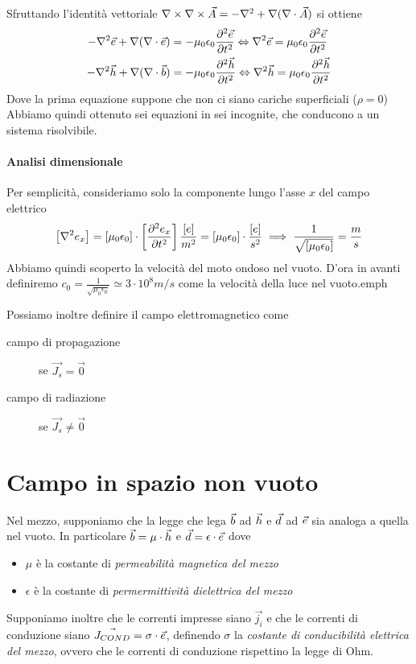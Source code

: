 Sfruttando l'identità vettoriale $\rot\rot\vec{A} = -\nabla^2 + \nabla(\diverg\vec{A})$ si ottiene
\begin{equation}\begin{split}
  -\nabla^2\e + \nabla(\diverg\e) &= - \mu_0\epsilon_0 \deriv[2]{\e}{t} \Leftrightarrow \nabla^2\e = \mu_0\epsilon_0\deriv[2]{\e}{t}\\
  -\nabla^2\h + \nabla(\diverg\b) &= - \mu_0\epsilon_0 \deriv[2]{\h}{t} \Leftrightarrow \nabla^2\h = \mu_0\epsilon_0\deriv[2]{\h}{t}\\
\end{split}\end{equation}
Dove la prima equazione suppone che non ci siano cariche superficiali ($\rho=0$)
Abbiamo quindi ottenuto sei equazioni in sei incognite, che conducono a un sistema risolvibile.

\paragraph{Analisi dimensionale}

Per semplicità, consideriamo solo la componente lungo l'asse $x$ del campo elettrico
\begin{equation}
  \left[\nabla^2 e_x\right] = \left[\mu_0\epsilon_0\right]  \cdot \left[\deriv[2]{e_x}{t}\right] \\
  \frac{[e]}{m^2} = [\mu_0\epsilon_0] \cdot \frac{[e]}{s^2} \implies \frac{1}{\sqrt{[\mu_0\epsilon_0]}} = \frac{m}{s}
\end{equation}
Abbiamo quindi scoperto la velocità del moto ondoso nel vuoto. D'ora in avanti definiremo
$c_0 = \frac{1}{\sqrt{\mu_0\epsilon_0}} \simeq 3 \cdot 10^8 m/s$ come la velocità della luce nel vuoto.emph

Possiamo inoltre definire il campo elettromagnetico come

\begin{description}
  \item [campo di propagazione] se $\vec{J_s}=\vec{0}$
  \item [campo di radiazione] se $\vec{J_s}\neq\vec{0}$
\end{description}

\section{Campo in spazio non vuoto}
Nel mezzo, supponiamo che la legge che lega $\b$ ad $\h$ e $\d$ ad $\e$ sia analoga a quella nel vuoto.
In particolare $\b=\mu\cdot\h$ e $\d=\epsilon\cdot\e$ dove
\begin{itemize}
  \item $\mu$ è la costante di \emph{permeabilità  magnetica del mezzo}
  \item $\epsilon$ è la costante di \emph{permermittività  dielettrica del mezzo}
\end{itemize}
Supponiamo inoltre che le correnti impresse siano $\vec{j_i}$ e che le correnti di conduzione siano $\vec{J_{COND}} = \sigma \cdot \e$, definendo $\sigma$ la \emph{costante di conducibilità elettrica del mezzo}, ovvero che le correnti di conduzione rispettino la legge di Ohm.

